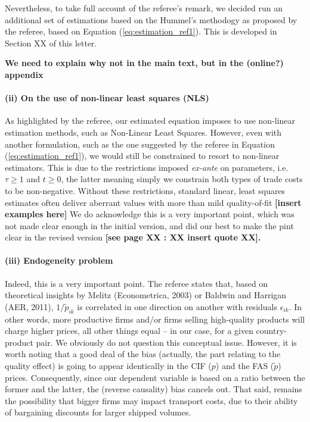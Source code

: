 \documentclass[a4paper,12pt]{article}
\begin{document}
Nevertheless, to take full account of the referee’s remark, we decided run an additional set of estimations based on the Hummel's methodogy as proposed by the referee, based on Equation (\ref{eq:estimation_ref1}). This is developed in Section XX of this letter.

\textbf{We need to explain why not in the main text, but in the (online?) appendix}

\paragraph{(ii) On the use of non-linear least squares (NLS)}
As highlighted by the referee, our estimated equation imposes to use non-linear estimation methods, such as Non-Linear Least Squares. However, even with another formulation, such as the one suggested by the referee in Equation (\ref{eq:estimation_ref1}), we would still be constrained to resort to non-linear estimators. This is due to the restrictions imposed \textit{ex-ante} on parameters, i.e. $\tau \geq 1$ and $t \geq 0$, the latter meaning simply we constrain both types of trade costs to be non-negative. Without these restrictions, standard linear, least squares estimates often deliver aberrant values with more than mild quality-of-fit \textbf{[insert examples here]}
We do acknowledge this is a very important point, which was not made clear enough in the initial version, and did our best to make the pint clear in the revised version \textbf{[see page XX : XX insert quote XX].}

\paragraph{(iii) Endogeneity problem}
Indeed, this is a very important point. The referee states that, based on theoretical insights by Melitz (Econometrica, 2003) or Baldwin and Harrigan (AER, 2011), $1/\tilde{p}_{ik}$ is correlated in one direction on another with residuals $\epsilon_{ik}$. In other words, more productive firms and/or firms selling high-quality products will charge higher prices, all other things equal – in our case, for a given country-product pair. We obviously do not question this conceptual issue. However, it is worth noting that a good deal of the bias (actually, the part relating to the quality effect) is going to appear identically in the CIF ($p$) and the FAS ($\tilde{p}$) prices. Consequently, since our dependent variable is based on a ratio between the former and the latter, the (reverse causality) bias cancels out. That said, remains the possibility that bigger firms may impact transport costs, due to their ability of bargaining discounts for larger shipped volumes.
\end{document}
